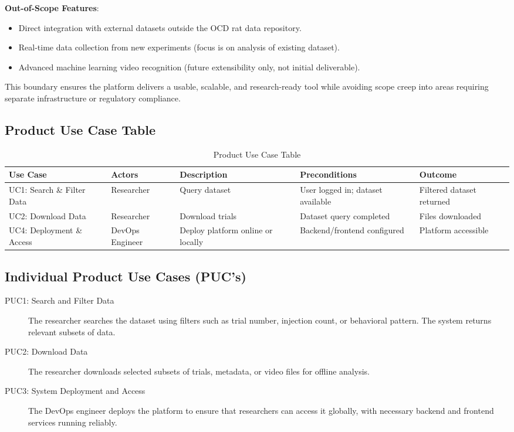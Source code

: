 \documentclass[12pt]{article}
\begin{document}
\textbf{Out-of-Scope Features}:
\begin{itemize}
    \item Direct integration with external datasets outside the OCD rat data repository.
    \item Real-time data collection from new experiments (focus is on analysis of existing dataset).
    \item Advanced machine learning video recognition (future extensibility only, not initial deliverable).
\end{itemize}

This boundary ensures the platform delivers a usable, scalable, and research-ready tool while avoiding scope creep into areas requiring separate infrastructure or regulatory compliance.

\subsection{Product Use Case Table}

\begin{table}[h!]
\centering
\begin{tabular}{|p{2.5cm}|p{2cm}|p{3.0cm}|p{3.0cm}|p{2.5cm}|}
\hline
\textbf{Use Case} & \textbf{Actors} & \textbf{Description} & \textbf{Preconditions} & \textbf{Outcome} \\
\hline
UC1: Search \& Filter Data & Researcher & Query dataset & User logged in; dataset available & Filtered dataset returned \\
\hline
UC2: Download Data & Researcher & Download trials & Dataset query completed & Files downloaded \\
\hline
UC4: Deployment \& Access & DevOps Engineer & Deploy platform online or locally & Backend/frontend configured & Platform accessible \\
\hline
\end{tabular}
\caption{Product Use Case Table}
\end{table}

\subsection{Individual Product Use Cases (PUC’s)}

\begin{description}
\item[PUC1: Search and Filter Data] The researcher searches the dataset using filters such as trial number, injection count, or behavioral pattern. The system returns relevant subsets of data.
\item[PUC2: Download Data] The researcher downloads selected subsets of trials, metadata, or video files for offline analysis.
\item[PUC3: System Deployment and Access] The DevOps engineer deploys the platform to ensure that researchers can access it globally, with necessary backend and frontend services running reliably.
\end{description}
\end{document}
